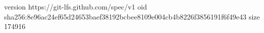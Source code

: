 version https://git-lfs.github.com/spec/v1
oid sha256:8e96ac24ef65d24653baef38192bcbee8109e004cb4b8226f3856191f6f49e43
size 174916
